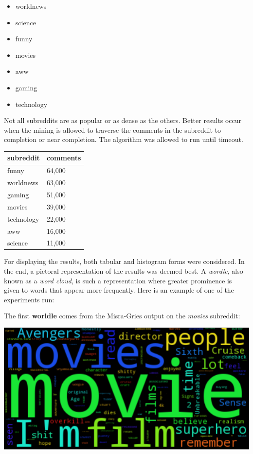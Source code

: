 \documentclass[12pt]{article}
\numberwithin{equation}{section}
\begin{document}
\begin{itemize} \itemsep1pt \parskip0pt 

  \item worldnews
  \item science
  \item funny
  \item movies
  \item aww
  \item gaming
  \item technology
  
\end{itemize}

Not all subreddits are as popular or as dense as the others.  Better results occur when the mining is allowed to traverse the comments in the subreddit to completion or near completion.  The algorithm was allowed to run until timeout.  

\begin{table}[h!]
\begin{tabular}{ll}
\textbf{subreddit} & \textbf{comments} \\
 \hline
funny              & 64,000           \\
worldnews          & 63,000           \\
gaming             & 51,000           \\
movies             & 39,000           \\
technology         & 22,000           \\
aww                & 16,000           \\
science            & 11,000          
\end{tabular}
\end{table}



For displaying the results, both tabular and histogram forms were considered.  In the end, a pictoral representation of the results was deemed best.  A \textit{wordle}, also known as a \textit{word cloud}, is such a representation where  greater prominence is given to words that appear more frequently.  Here is an example of one of the experiments run: 

\centering
The first \textbf{worldle} comes from the Misra-Gries output on the \textit{movies} subreddit:

\includegraphics[scale=.5]{movies.png}
\end{document}
